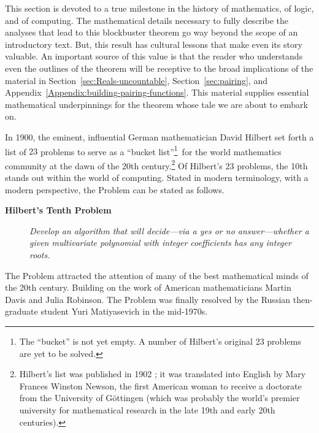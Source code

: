 This section is devoted to a true milestone in the history of mathematics, of logic, and of computing.  The mathematical details necessary to fully describe the analyses that lead to this blockbuster theorem go way beyond the scope of an introductory text.  But, this result has cultural lessons that make even its story valuable.  An important source of this value is that the reader who understands even the outlines of the theorem will be receptive to the broad implications of the material in Section~\ref{sec:Reals-uncountable}, Section~\ref{sec:pairing}, and Appendix~\ref{Appendix:building-pairing-functions}.  This material supplies essential mathematical underpinnings for the theorem whose tale we are about to embark on.

\medskip

   

In 1900, the eminent, influential German mathematician David Hilbert set forth a list of $23$ problems to serve as a ``bucket list''\footnote{The ``bucket'' is not yet empty.  A number of Hilbert's original 23 problems are yet to be solved.}~for the world mathematics community at the dawn of the 20th century.\footnote{Hilbert's list was published in 1902 \cite{Hilbert02}; it was translated into English by Mary Frances Winston Newson, the first American woman to receive a doctorate from the University of G\"{o}ttingen (which was probably the world's premier university for mathematical research in the late 19th and early 20th centuries).}  Of Hilbert's 23 problems, the 10th stands out within the world of computing.  Stated in modern terminology, with a modern perspective, the Problem can be stated as follows.
\begin{description}
\item[{\bf Hilbert's Tenth Problem}]
{\it Develop an algorithm that will decide---via a {\sc yes} or {\sc no} answer---whether a given multivariate polynomial with integer coefficients has any integer roots.}
\end{description}
The Problem attracted the attention of many of the best mathematical minds of the 20th century.  Building on the work of American mathematicians Martin Davis and Julia Robinson.  The Problem was finally resolved by the Russian then-graduate student Yuri Matiyasevich in the mid-1970s.
  

\bigskip

\noindent {}

